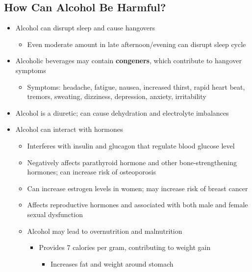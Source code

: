 \documentclass[12pt]{article}
\begin{document}
        \subsection{How Can Alcohol Be Harmful?}
            \begin{itemize}
                \item Alcohol can disrupt sleep and cause hangovers
                    \begin{itemize}
                        \item Even moderate amount in late afternoon/evening can disrupt sleep cycle
                    \end{itemize}
                \item Alcoholic beverages may contain \textbf{congeners}, which contribute to hangover symptoms
                    \begin{itemize}
                        \item Symptoms: headache, fatigue, nausea, increased thirst, rapid heart beat, tremors, sweating, dizziness, depression, anxiety, irritability
                    \end{itemize}
                \item Alcohol is a diuretic; can cause dehydration and electrolyte imbalances
                \item Alcohol can interact with hormones
                    \begin{itemize}
                        \item Interferes with insulin and glucagon that regulate blood glucose level
                        \item Negatively affects parathyroid hormone and other bone-strengthening hormones; can increase risk of osteoporosis
                        \item Can increase estrogen levels in women; may increase risk of breast cancer
                        \item Affects reproductive hormones and associated with both male and female sexual dysfunction
                        \item Alcohol may lead to overnutrition and malnutrition
                            \begin{itemize}
                                \item Provides 7 calories per gram, contributing to weight gain
                                    \begin{itemize}
                                        \item Increases fat and weight around stomach

\end{itemize}
\end{itemize}
\end{itemize}
\end{itemize}
\end{document}
